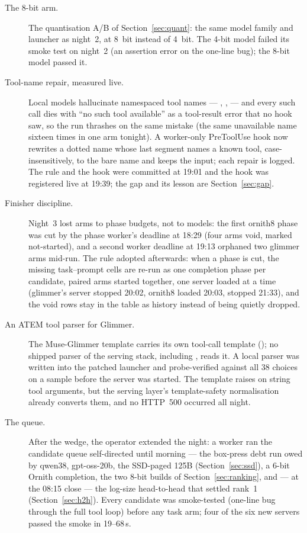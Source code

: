 \begin{description}
	\item[The 8-bit arm.] The quantisation A/B of Section~\ref{sec:quant}: the same model family and launcher as
	night~2, at 8~bit instead of 4~bit. The 4-bit model failed its smoke test on night~2 (an assertion error on the
	one-line bug); the 8-bit model passed it.
	\item[Tool-name repair, measured live.] Local models hallucinate namespaced tool names --- ,
	,  --- and every such call dies with ``no such tool available'' as a tool-result
	error that no hook saw, so the run thrashes on the same mistake (the same unavailable name sixteen times in one
	arm tonight). A worker-only PreToolUse hook now rewrites a dotted name whose last segment names a known tool,
	case-insensitively, to the bare name and keeps the input; each repair is logged. The rule and the hook were
	committed at 19:01 and the hook was registered live at 19:39; the gap and its lesson are Section~\ref{sec:gap}.
	\item[Finisher discipline.] Night~3 lost arms to phase budgets, not to models: the first ornith8 phase was cut
	by the phase worker's deadline at 18:29 (four arms void, marked not-started), and a second worker deadline at
	19:13 orphaned two glimmer arms mid-run. The rule adopted afterwards: when a phase is cut, the missing
	task--prompt cells are re-run as one completion phase per candidate, paired arms started together, one server
	loaded at a time (glimmer's server stopped 20:02, ornith8 loaded 20:03, stopped 21:33), and the void rows stay
	in the table as history instead of being quietly dropped.
	\item[An ATEM tool parser for Glimmer.] The Muse-Glimmer template carries its own tool-call template
	(); no shipped parser of the serving stack, including , reads it. A local
	parser was written into the patched launcher and probe-verified against all 38 choices on a sample before the
	server was started. The template raises on string tool arguments, but the serving layer's template-safety
	normalisation already converts them, and no HTTP~500 occurred all night.
	\item[The queue.] After the wedge, the operator extended the night: a worker ran the candidate queue
	self-directed until morning --- the box-press debt run owed by qwen38, gpt-oss-20b, the SSD-paged 125B
	(Section~\ref{sec:ssd}), a 6-bit Ornith completion, the two 8-bit builds of Section~\ref{sec:ranking}, and
	--- at the 08:15 close --- the log-size head-to-head that settled rank~1 (Section~\ref{sec:h2h}).
	Every candidate was smoke-tested (one-line bug through the full tool loop) before any task arm; four of the
	six new servers passed the smoke in 19--68\,s.
\end{description}

